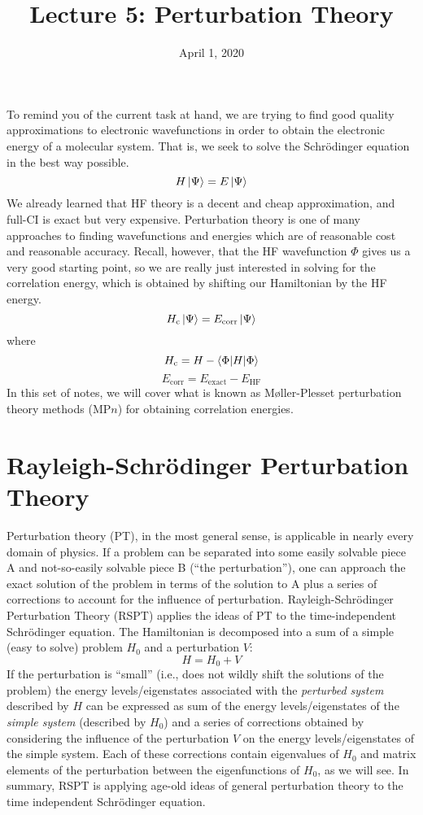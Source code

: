 \documentclass{article}
\title{Lecture 5: Perturbation Theory}
\date{April 1, 2020}
\newcommand{\Ecorr}{E_{\mathrm{corr}}}
\newcommand{\Hc}{H_{\mathrm{c}}}
\begin{document}
\maketitle
\noindent
To remind you of the current task at hand, we are trying to find good quality approximations 
    to electronic wavefunctions in order to obtain the electronic energy of a molecular system. 
That is, we seek to solve the Schr{\"o}dinger equation in the best way possible.
\[H \ket{\Psi} = E \ket{\Psi} \]
We already learned that HF theory is a decent and cheap approximation, and full-CI is exact but very expensive. 
Perturbation theory is one of many approaches to finding wavefunctions and energies which are of 
    reasonable cost and reasonable accuracy.
Recall, however, that the HF wavefunction $\Phi$ gives us a very good starting point, so we are really just interested in solving for the correlation energy,
which is obtained by shifting our Hamiltonian by the HF energy.
\[\Hc \ket{\Psi} = \Ecorr \ket{\Psi} \]
where 
\[\Hc = H - \braket{\Phi| H | \Phi} \]
\[\Ecorr = E_{\mathrm{exact}} - E_{\mathrm{HF}}\]
In this set of notes, we will cover what is known as M{\o}ller-Plesset perturbation theory methods (MP$n$) 
    for obtaining correlation energies.

\section{Rayleigh-Schr{\"o}dinger Perturbation Theory}
Perturbation theory (PT), in the most general sense, is applicable in nearly every domain of physics. 
If a problem can be separated into some easily solvable piece A and not-so-easily solvable piece B 
    (``the perturbation''), one can approach the exact solution of the problem in terms of the solution to A 
    plus a series of corrections to account for the influence of perturbation.
Rayleigh-Schr{\"o}dinger Perturbation Theory (RSPT) applies the ideas of PT to the time-independent 
    Schr{\"o}dinger equation.
The Hamiltonian is decomposed into a sum of a simple (easy to solve) problem $H_0$ and a perturbation $V$:
\[H = H_0 + V \]
If the perturbation is ``small'' (i.e., does not wildly shift the solutions of the problem) the 
    energy levels/eigenstates associated with the \textit{perturbed system} described by $H$ can be expressed 
    as sum of the energy levels/eigenstates of  the \textit{simple system} (described by $H_0$) and a series 
    of corrections obtained by considering the influence of the perturbation $V$ on the 
    energy levels/eigenstates of the simple system.
Each of these corrections contain eigenvalues of $H_0$ and matrix elements of the perturbation 
    between the eigenfunctions of $H_0$, as we will see.
In summary, RSPT is applying age-old ideas of general perturbation theory to the
    time independent Schr{\"o}dinger equation.
\end{document}
